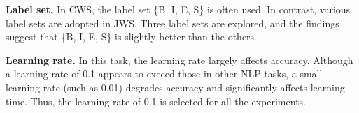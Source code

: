 \documentclass[11pt,letterpaper]{article}
\begin{document}
\noindent
{\bf Label set.}  In CWS, the label set \{B, I, E, S\} is often used. In contrast, various label sets are adopted in JWS. Three label sets are explored, and the findings suggest that \{B, I, E, S\} is slightly better than the others.

\noindent
{\bf Learning rate.} In this task, the learning rate largely affects accuracy. Although a learning rate of 0.1 appears to exceed those in other NLP tasks, a small learning rate (such as 0.01) degrades accuracy and significantly affects learning time. Thus, the learning rate of 0.1 is selected for all the experiments.


\begin{table}[t]
                                                                                                                                                                                                                                                                                                                                                                                                                                 

\end{table}
\end{document}
